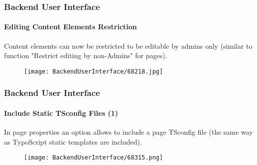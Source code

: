 \begin{frame}[fragile]
	\frametitle{Backend User Interface}
	\framesubtitle{Editing Content Elements Restriction}

	Content elements can now be restricted to be editable by admins only
	(similar to function "Restrict editing by non-Admins" for pages).

	\begin{figure}
		\texttt{[image: BackendUserInterface/68218.jpg]}
	\end{figure}

\end{frame}

\begin{frame}[fragile]
	\frametitle{Backend User Interface}
	\framesubtitle{Include Static TSconfig Files (1)}

	In page properties an option allows to include a page TSconfig file
	(the same way as TypoScript static templates are included).

	\begin{figure}
		\texttt{[image: BackendUserInterface/68315.png]}
	\end{figure}

\end{frame}

